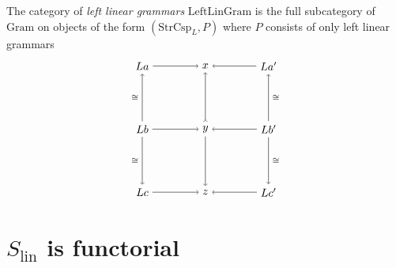 \documentclass{amsart}
\newcommand{\lin}{_{\textrm{lin}}}
\newcommand{\iso}{\cong}
\newcommand{\Gram}{\cat{Gram}}
\newcommand{\LeftLinGram}{\cat{LeftLinGram}}
\newcommand{\StrCsp}{\cat{StrCsp}}
\newcommand{\cat}[1]{\mathrm{#1}}
\theoremstyle{remark}
\theoremstyle{definition}
\begin{document}
The category of \emph{left linear grammars} $ \LeftLinGram $ is the
  full subcategory of $ \Gram $ on objects of the form
  $ ( \StrCsp_L , P) $ where $ P $ consists of only left linear
  grammars
%
  \[
    \begin{tikzpicture}
      \begin{scope}
        \node (1) at (0,4) {\( La \)}; \node (2) at (2,4) {\( x \)};
        \node (3) at (4,4) {\( La' \)}; \node (4) at (0,2) {\( Lb \)};
        \node (5) at (2,2) {\( y \)}; \node (6) at (4,2) {\( Lb' \)};
        \node (7) at (0,0) {\( Lc \)}; \node (8) at (2,0) {\( z \)};
        \node (9) at (4,0) {\( Lc' \)}; \draw [->] (1) to node []
        {\scriptsize{\( \)}} (2); \draw [->] (3) to node []
        {\scriptsize{\( \)}} (2); \draw [->] (4) to node []
        {\scriptsize{\( \)}} (5); \draw [->] (6) to node []
        {\scriptsize{\( \)}} (5); \draw [->] (7) to node []
        {\scriptsize{\( \)}} (8); \draw [->] (9) to node []
        {\scriptsize{\( \)}} (8); \draw [->] (4) to node [left]
        {\scriptsize{\( \iso \)}} (1); \draw [->] (4) to node [left]
        {\scriptsize{\( \iso \)}} (7); \draw [>->] (5) to node []
        {\scriptsize{\( \)}} (2); \draw [->] (5) to node []
        {\scriptsize{\( \)}} (8); \draw [->] (6) to node [right]
        {\scriptsize{\( \iso \)}} (3); \draw [->] (6) to node [right]
        {\scriptsize{\( \iso \)}} (9);
      \end{scope}
    \end{tikzpicture}
  \]
%


\appendix
  
\section{$ S\lin $ is functorial}
\label{sec:Slin-functor}
\end{document}
